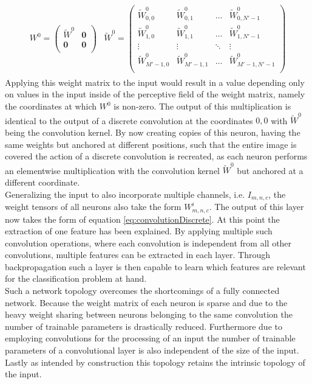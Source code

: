 \begin{align}
\begin{split}
W^0 = 
\begin{pmatrix}
\tilde{W}^0 & \boldsymbol{0} \\
\boldsymbol{0} & \boldsymbol{0} \\
\end{pmatrix}
\end{split}
\begin{split}
\tilde{W}^0 = 
\begin{pmatrix}
\tilde{W}_{0,0}^0 & \tilde{W}_{0,1}^0 & \dots & \tilde{W}_{0,N'-1}^0 \\
\tilde{W}_{1,0}^0 & \tilde{W}_{1,1}^0 & \dots & \tilde{W}_{1,N'-1}^0 \\
\vdots & \vdots & \ddots & \vdots \\
\tilde{W}_{M'-1,0}^0 & \tilde{W}_{M'-1,1}^0 & \dots & \tilde{W}_{M'-1,N'-1}^0 \\
\end{pmatrix}
\end{split}
\end{align}
Applying this weight matrix to the input would result in a value depending only on values in the input inside of the perceptive field of the weight matrix, namely the coordinates at which $W^0$ is non-zero. The output of this multiplication is identical to the output of a discrete convolution at the coordinates $0,0$ with $\tilde{W}^0$ being the convolution kernel. By now creating copies of this neuron, having the same weights but anchored at different positions, such that the entire image is covered the action of a discrete convolution is recreated, as each neuron performs an elementwise multiplication with the convolution kernel $\tilde{W}^0$ but anchored at a different coordinate. \\

Generalizing the input to also incorporate multiple channels, i.e. $I_{m,n,c}$, the weight tensors of all neurons also take the form $W^i_{m,n,c}$. The output of this layer now takes the form of equation \ref{eq:convolutionDiscrete}. At this point the extraction of one feature has been explained. By applying multiple such convolution operations, where each convolution is independent from all other convolutions, multiple features can be extracted in each layer. Through backpropagation such a layer is then capable to learn which features are relevant for the classification problem at hand. \\

Such a network topology overcomes the shortcomings of a fully connected network. Because the weight matrix of each neuron is sparse and due to the heavy weight sharing between neurons belonging to the same convolution the number of trainable parameters is drastically reduced. Furthermore due to employing convolutions for the processing of an input the number of trainable parameters of a convolutional layer is also independent of the size of the input. Lastly as intended by construction this topology retains the intrinsic topology of the input. \\

